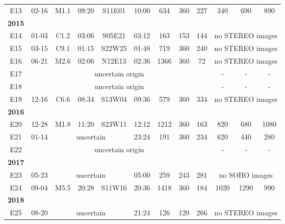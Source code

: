 \begin{table}[htp]
\begin{adjustbox}{width=\textwidth}
\begin{tabular}{@{}cccccccccccc@{}}
			E13 & 02-16 & M1.1 & 09:20 & S11E01 & 10:00 & 634 & 360 & 227 & 340 & 690 & 890 \\
			\textbf{2015}\\
			E14 & 01-03 & C1.2 & 03:06 & S05E21 & 03:12 & 163 & 153 & 144 & \multicolumn{3}{c}{no STEREO images} \\
			E15 & 03-15 & C9.1 & 01:15 & S22W25 & 01:48 & 719 & 360 & 240 & \multicolumn{3}{c}{no STEREO images} \\
			E16 & 06-21 & M2.6 & 02:06 & N12E13 & 02:36 & 1366 & 360 & 72 & \multicolumn{3}{c}{no STEREO images} \\
			E17 & \multicolumn{8}{c}{uncertain origin} & - & - & - \\
			E18 & \multicolumn{8}{c}{uncertain origin} & - & - & - \\
			E19 & 12-16 & C6.6 & 08:34 & S13W04 & 09:36 & 579 & 360 & 334 & \multicolumn{3}{c}{no STEREO images} \\
			\textbf{2016} \\
			E20 & 12-28 & M1.8 & 11:20 & S23W11 & 12:12 & 1212 & 360 & 163 & 820 & 680 & 1080 \\
			E21 & 01-14 & \multicolumn{3}{c}{uncertain} & 23:24 & 191 & 360 & 234 & 620 & 440 & 280 \\
			E22 & \multicolumn{8}{c}{uncertain origin} & - & - & - \\
			\textbf{2017}\\
			E23 & 05-23 & \multicolumn{3}{c}{uncertain} & 05:00 & 259 & 243 & 281 & \multicolumn{3}{c}{no SOHO images}\\
			E24 & 09-04 & M5.5 & 20:28 & S11W16 & 20:36 & 1418 & 360 & 184 & 1020 & 1290 & 990 \\
			\textbf{2018}\\
			E25 & 08-20 & \multicolumn{3}{c}{uncertain} & 21:24 & 126 & 120 & 266 & \multicolumn{3}{c}{no STEREO images} \\
			\bottomrule
			\end{tabular}
		\end{adjustbox}
	\end{table}

